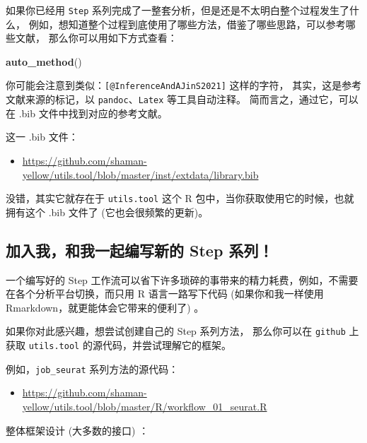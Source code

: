 \documentclass[
]{article}
\newenvironment{Shaded}{\begin{snugshade}}{\end{snugshade}}
\newcommand{\KeywordTok}[1]{\textcolor[rgb]{0.13,0.29,0.53}{\textbf{#1}}}
\newcommand{\NormalTok}[1]{#1}
\providecommand{\tightlist}{%
  \setlength{\itemsep}{0pt}\setlength{\parskip}{0pt}}
\begin{document}
如果你已经用 \texttt{Step} 系列完成了一整套分析，但是还是不太明白整个过程发生了什么，
例如，想知道整个过程到底使用了哪些方法，借鉴了哪些思路，可以参考哪些文献，
那么你可以用如下方式查看：

\begin{Shaded}
\begin{Highlighting}[]
\KeywordTok{auto\_method}\NormalTok{()}
\end{Highlighting}
\end{Shaded}

你可能会注意到类似：\texttt{{[}@InferenceAndAJinS2021{]}} 这样的字符，
其实，这是参考文献来源的标记，以 \texttt{pandoc}、\texttt{Latex} 等工具自动注释。
简而言之，通过它，可以在 .bib 文件中找到对应的参考文献。

这一 .bib 文件：

\begin{itemize}
\tightlist
\item
  \url{https://github.com/shaman-yellow/utils.tool/blob/master/inst/extdata/library.bib}
\end{itemize}

没错，其实它就存在于 \texttt{utils.tool} 这个 R 包中，当你获取使用它的时候，也就拥有这个 .bib 文件了
(它也会很频繁的更新)。

\hypertarget{ux52a0ux5165ux6211ux548cux6211ux4e00ux8d77ux7f16ux5199ux65b0ux7684-step-ux7cfbux5217}{%
\subsection{加入我，和我一起编写新的 Step 系列！}\label{ux52a0ux5165ux6211ux548cux6211ux4e00ux8d77ux7f16ux5199ux65b0ux7684-step-ux7cfbux5217}}

一个编写好的 Step 工作流可以省下许多琐碎的事带来的精力耗费，例如，不需要在各个分析平台切换，而只用
R 语言一路写下代码 (如果你和我一样使用 Rmarkdown，就更能体会它带来的便利了) 。

如果你对此感兴趣，想尝试创建自己的 Step 系列方法，
那么你可以在 \texttt{github} 上获取 \texttt{utils.tool} 的源代码，并尝试理解它的框架。

例如，\texttt{job\_seurat} 系列方法的源代码：

\begin{itemize}
\tightlist
\item
  \url{https://github.com/shaman-yellow/utils.tool/blob/master/R/workflow_01_seurat.R}
\end{itemize}

整体框架设计 (大多数的接口) ：
\end{document}
